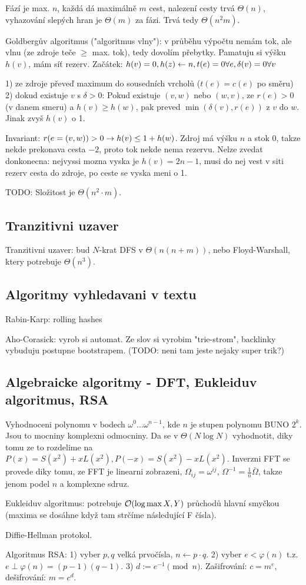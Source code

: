 Fází je max. $n$, každá dá maximálně $m$ cest, nalezení cesty trvá $\Theta(n)$,
vyhazování slepých hran je $\Theta(m)$ za fázi. Trvá tedy $\Theta(n^2 m)$.

Goldbergův algoritmus ("algoritmus vlny"):
v průběhu výpočtu nemám tok, ale vlnu (ze zdroje teče $\geq$ max. tok),
tedy dovolím přebytky. Pamatuju si výšku $h(v)$, mám síť rezerv.
Začátek: $h(v)=0, h(z)\gets n, t(e)=0 \forall e, \delta(v)=0 \forall v$

1) ze zdroje převeď maximum do sousedních vrcholů ($t(e)=c(e)$ po směru)
2) dokud existuje $v$ s $\delta>0$:
	Pokud existuje $(v,w)$ nebo $(w,v)$, ze $r(e)>0$ (v danem smeru)
	a $h(v)\geq h(w)$, pak preved $\min(\delta(v), r(e))$ z $v$ do $w$.
	Jinak zvyš $h(v)$ o 1.

Invariant: $r(e=(v,w))>0\rightarrow h(v)\leq 1+h(w)$.
Zdroj má výšku $n$ a stok $0$, takze nekde prekonava cesta $-2$, proto tok nekde
nema rezervu.
Nelze zvedat donkonecna: nejvyssi mozna vyska je $h(v)=2n-1$, musi do nej vest v
siti rezerv cesta do zdroje, po ceste se vyska meni o 1.

TODO: Složitost je $\Theta(n^2\cdot m)$.

\subsection{Tranzitivni uzaver}
Tranzitivni uzaver: bud $N$-krat DFS v $\Theta(n(n+m))$, nebo Floyd-Warshall,
ktery potrebuje $\Theta(n^3)$.

\subsection{Algoritmy vyhledavani v textu}
Rabin-Karp: rolling hashes

Aho-Corasick: vyrob si automat. Ze slov si vyrobim "trie-strom", backlinky
vybuduju postupne bootstrapem. (TODO: neni tam jeste nejaky super trik?)

\subsection{Algebraicke algoritmy - DFT, Eukleiduv algoritmus, RSA}

Vyhodnoceni polynomu v bodech $\omega^0\ldots\omega^{n-1}$, kde
$n$ je stupen polynomu BUNO $2^k$. Jsou to mocniny komplexni odmocniny.
Da se v $\Theta(N\log N)$ vyhodnotit, diky tomu ze to rozdelime na
$P(x)=S(x^2)+xL(x^2), P(-x)=S(x^2)-xL(x^2)$. Inverzni FFT se provede
diky tomu, ze FFT je linearni zobrazeni, $\Omega_{ij}=\omega^{ij}$,
$\Omega^{-1}=\frac{1}{n}\bar{\Omega}$, takze jenom podel $n$ a komplexne sdruz.

Eukleiduv algoritmus: potrebuje $\mathcal{O}(\log \max{X,Y})$ průchodů hlavní smyčkou
(maxima se dosáhne když tam strčíme následující F čísla).

Diffie-Hellman protokol.

Algoritmus RSA: 1) vyber $p,q$ velká prvočísla, $n\gets p\cdot q$.
2) vyber $e<\varphi(n)$ t.z. $e\perp \varphi(n)=(p-1)(q-1)$.
3) $d:=e^{-1}\pmod n$.
Zašifrování: $c=m^e$, dešifrování: $m=c^d$.
